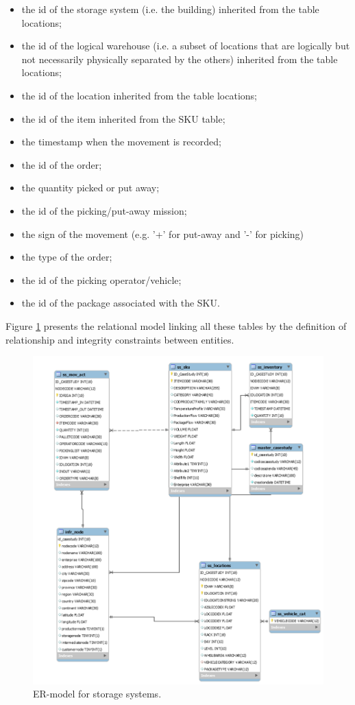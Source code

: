 \begin{itemize}
    \item the id of the storage system (i.e. the building) inherited from the table locations;
    \item the id of the logical warehouse (i.e. a subset of locations that are logically but not necessarily physically separated by the others) inherited from the table locations;
    \item the id of the location inherited from the table locations;
    \item the id of the item inherited from the SKU table;
    \item the timestamp when the movement is recorded;
    \item the id of the order;
    \item the quantity picked or put away;
    \item the id of the picking/put-away mission;
    \item the sign of the movement (e.g. '+' for put-away and '-' for picking)
    \item the type of the order;
    \item the id of the picking operator/vehicle;
    \item the id of the package associated with the SKU.

\end{itemize}

Figure \ref{fig_ER_wh} presents the relational model linking all these tables by the definition of relationship and integrity constraints between entities.

\begin{figure}[hbt!]
\centering
\includegraphics[width=1\textwidth]{SectionWarehouses/diagnsticModels_figures/fig_ER.png}
\captionsetup{type=figure}
\caption{ER-model for storage systems.}
\label{fig_ER_wh}
\end{figure}

